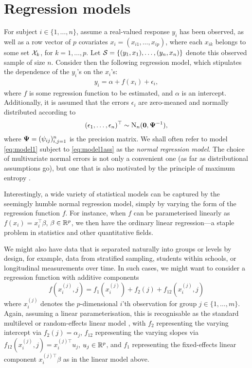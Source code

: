\documentclass[11pt,twoside,openright,showframe]{report}
\begin{document}
\section{Regression models}
\label{sec:introregmod}

For subject $i \in \{1,\dots,n\}$, assume a real-valued response $y_i$ has been observed, as well as a row vector of $p$ covariates $x_i = (x_{i1},\dots,x_{ip})$, where each $x_{ik}$ belongs to some set ${\mathcal X}_k$, for $k = 1,\dots,p$.
Let ${\mathcal S} = \{(y_1, x_1), \dots, (y_n,x_n)\}$ denote this observed sample of size $n$.
Consider then the following regression model, which stipulates the dependence of the $y_i$'s on the $x_i$'s:
\begin{align}\label{eq:model1}
  y_i = \alpha + f(x_i) + \epsilon_i,
\end{align}
where $f$ is some regression function to be estimated, and $\alpha$ is an intercept.
Additionally, it is assumed that the errors $\epsilon_i$ are zero-meaned and normally distributed according to
\begin{align}\label{eq:model1ass}
  (\epsilon_1, \dots, \epsilon_n)^\top \sim \operatorname{N}_n({\mathbf 0}, {\bm\Psi}^{-1}),
\end{align}
where ${\bm\Psi} = (\psi_{ij})_{i,j=1}^n$ is the precision matrix.
We shall often refer to model \cref{eq:model1} subject to \cref{eq:model1ass} as the \emph{normal regression model}.
The choice of multivariate normal errors is not only a convenient one (as far as distributional assumptions go), but one that is also motivated by the principle of maximum entropy \citep{jaynes1957a,jaynes1957b,jaynes2003probability}.

Interestingly, a wide variety of statistical models can be captured by the seemingly humble normal regression model, simply by varying the form of the regression function $f$.
For instance, when $f$ can be parameterised linearly as $f(x_i) = x_i^\top \beta$, $\beta \in \mathbb{R}^p$, we then have the ordinary linear regression---a staple problem in statistics and other quantitative fields.

We might also have data that is separated naturally into groups or levels by design, for example, data from stratified sampling, students within schools, or longitudinal measurements over time.
In such cases, we might want to consider a regression function with additive components
\[
  f(x_i^{(j)}, j) = f_1(x_i^{(j)}) + f_2(j) + f_{12}(x_i^{(j)}, j)
\]
where $x_i^{(j)}$ denotes the $p$-dimensional $i$'th observation for group $j\in\{1,\dots,m\}$.
Again, assuming a linear parameterisation, this is recognisable as the standard multilevel or random-effects linear model \citep{skrondal2012multilevel}, with $f_2$ representing the varying intercept via $f_2(j) = \alpha_{j}$, $f_{12}$ representing the varying slopes via $f_{12}(x_i^{(j)},j) = x_i^{(j)\top} u_{j}$,  $u_j \in \mathbb{R}^p$, and $f_1$ representing the fixed-effects linear component $ x_i^{(j)\top} \beta$ as in the linear model above.
\end{document}
